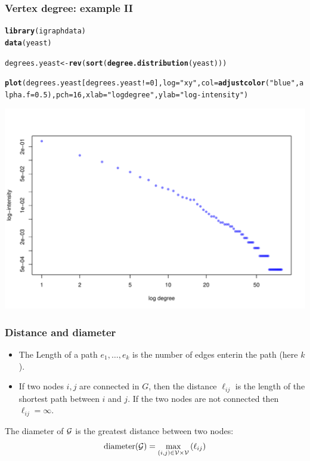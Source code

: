 \documentclass{beamer}\usepackage[]{graphicx}\usepackage[]{color}
\makeatletter
\newcommand{\hlnum}[1]{\textcolor[rgb]{0.686,0.059,0.569}{#1}}%
\newcommand{\hlstr}[1]{\textcolor[rgb]{0.192,0.494,0.8}{#1}}%
\newcommand{\hlopt}[1]{\textcolor[rgb]{0,0,0}{#1}}%
\newcommand{\hlstd}[1]{\textcolor[rgb]{0.345,0.345,0.345}{#1}}%
\newcommand{\hlkwb}[1]{\textcolor[rgb]{0.69,0.353,0.396}{#1}}%
\newcommand{\hlkwc}[1]{\textcolor[rgb]{0.333,0.667,0.333}{#1}}%
\newcommand{\hlkwd}[1]{\textcolor[rgb]{0.737,0.353,0.396}{\textbf{#1}}}%
\newenvironment{kframe}{%
 \def\at@end@of@kframe{}%
 \ifinner\ifhmode%
  \def\at@end@of@kframe{\end{minipage}}%
  \begin{minipage}{\columnwidth}%
 \fi\fi%
 \def\FrameCommand##1{\hskip\@totalleftmargin \hskip-\fboxsep
 \colorbox{shadecolor}{##1}\hskip-\fboxsep
     \hskip-\linewidth \hskip-\@totalleftmargin \hskip\columnwidth}%
 \MakeFramed {\advance\hsize-\width
   \@totalleftmargin\z@ \linewidth\hsize
   \@setminipage}}%
 {\par\unskip\endMakeFramed%
 \at@end@of@kframe}
\newenvironment{knitrout}{}{} %
\makeatother
\begin{document}
\begin{frame}
  \frametitle{Vertex degree: example II}

\begin{knitrout}\scriptsize
{}\color{fgcolor}\begin{kframe}
\begin{alltt}
\hlkwd{library}\hlstd{(igraphdata)}
\hlkwd{data}\hlstd{(yeast)}

\hlstd{degrees.yeast} \hlkwb{<-} \hlkwd{rev}\hlstd{(}\hlkwd{sort}\hlstd{(}\hlkwd{degree.distribution}\hlstd{(yeast)))}

\hlkwd{plot}\hlstd{(degrees.yeast[degrees.yeast}\hlopt{!=}\hlnum{0}\hlstd{],} \hlkwc{log}\hlstd{=}\hlstr{"xy"}\hlstd{,} \hlkwc{col}\hlstd{=}\hlkwd{adjustcolor}\hlstd{(}\hlstr{"blue"}\hlstd{,} \hlkwc{alpha.f} \hlstd{=} \hlnum{0.5}\hlstd{),} \hlkwc{pch}\hlstd{=}\hlnum{16}\hlstd{,} \hlkwc{xlab}\hlstd{=}\hlstr{"log degree"}\hlstd{,} \hlkwc{ylab}\hlstd{=}\hlstr{"log-intensity"}\hlstd{)}
\end{alltt}
\end{kframe}
\includegraphics[width=.8\textwidth]{figures/degree_2-1} 

\end{knitrout}
      
\end{frame}

\begin{frame}[allowframebreaks]
  \frametitle{Distance and diameter}

  \begin{definition}[distance]
    \begin{itemize}
    \item \alert{The Length}  of a path $e_1,\dots, e_k$ is the number of edges enterin the path (here $k$).
    \item If two nodes $i,j$ are connected in $G$, then \alert{the distance} $\ell_{ij}$ is the length of the shortest path between $i$ and $j$. If the two nodes are not connected then $\ell_{ij} = \infty$.
    \end{itemize}
  \end{definition}

  \begin{definition}[diameter]
    The diameter of $\mathcal{G}$ is the greatest distance between two nodes:
    \[
      \mathrm{diameter(\mathcal{G})} = \max_{(i,j)\in\mathcal{V}\times\mathcal{V}} \left(\ell_{ij}\right)
    \]
  \end{definition}

\end{frame}
\end{document}
